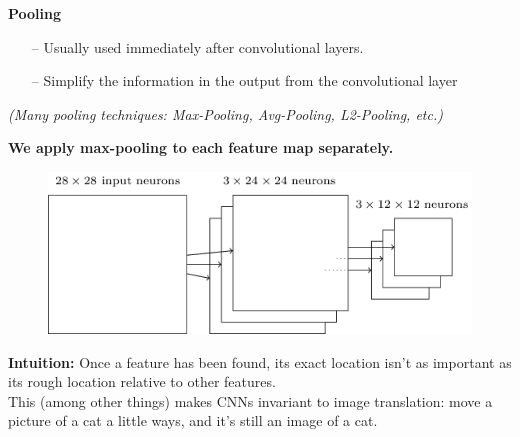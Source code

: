 \documentclass[10pt, compress]{beamer}
\begin{document}
\begin{frame}
  \vspace{0.6cm}
  \textbf{Pooling} \\
  \begin{itemize}
    \item[--] Usually used immediately after convolutional layers.
    \item[--] Simplify the information in the output from the convolutional layer
  \end{itemize}
  \begin{figure}[ht]
  	\centering
  	\qquad
  \end{figure}
  \textit{(Many pooling techniques: Max-Pooling, Avg-Pooling, L2-Pooling, etc.)}
\end{frame}

\begin{frame}
  \vspace{0.6cm}
  \textbf{We apply max-pooling to each feature map separately.} \\
  \begin{figure}
    \includegraphics[width=.7\linewidth]{imgs/cnn/pool_3}
  \end{figure}
  \textbf{Intuition:} Once a feature has been found, its exact location isn't as important as its rough location relative to other features. \\ \hfill \break
  This (among other things) makes CNNs invariant to image translation: move a picture of a cat a little ways, and it's still an image of a cat.
\end{frame}
\end{document}
